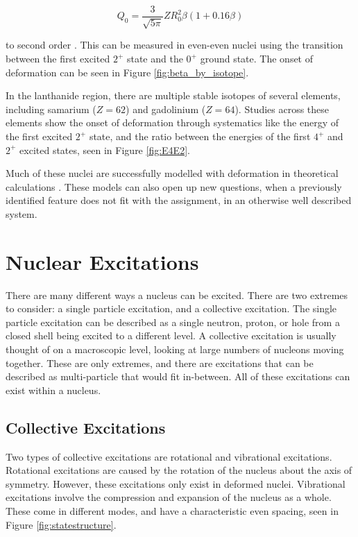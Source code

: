 \begin{equation}
    Q_0 = \frac{3}{\sqrt{5\pi}}ZR_0^2\beta\left(1+0.16\beta\right)
\end{equation}

to second order \citep{casten90:_structure}. This can be measured in even-even nuclei using the transition between the first excited $2^+$ state and the $0^+$ ground state. The onset of deformation can be seen in Figure \ref{fig:beta_by_isotope}.



In the lanthanide region, there are multiple stable isotopes of several elements, including samarium ($Z=62$) and gadolinium ($Z=64$). Studies across these elements show the onset of deformation through systematics like the energy of the first excited $2^+$ state, and the ratio between the energies of the first $4^+$ and $2^+$ excited states, seen in Figure \ref{fig:E4E2}.



Much of these nuclei are successfully modelled with deformation in theoretical calculations \citep{delaroche10:_systematics}. These models can also open up new questions, when a previously identified feature does not fit with the assignment, in an otherwise well described system.

\section{Nuclear Excitations}

There are many different ways a nucleus can be excited. There are two extremes to consider: a single particle excitation, and a collective excitation. The single particle excitation can be described as a single neutron, proton, or hole from a closed shell being excited to a different level. A collective excitation is usually thought of on a macroscopic level, looking at large numbers of nucleons moving together. These are only extremes, and there are excitations that can be described as multi-particle that would fit in-between. All of these excitations can exist within a nucleus.

\subsection{Collective Excitations}

Two types of collective excitations are rotational and vibrational excitations. Rotational excitations are caused by the rotation of the nucleus about the axis of symmetry. However, these excitations only exist in deformed nuclei. Vibrational excitations involve the compression and expansion of the nucleus as a whole. These come in different modes, and have a characteristic even spacing, seen in Figure \ref{fig:statestructure}.

